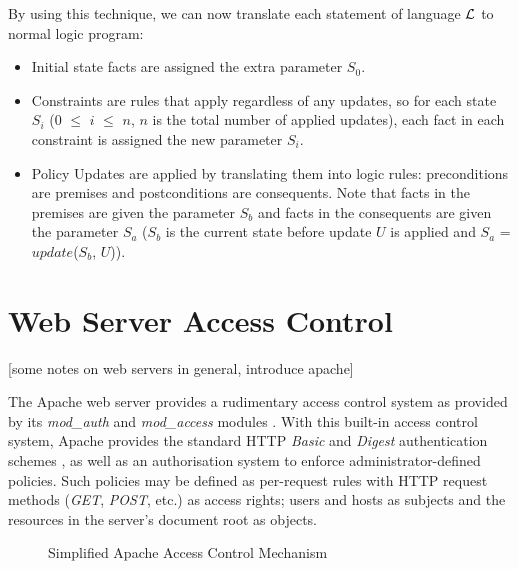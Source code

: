 \documentclass[11pt]{llncs}
\begin{document}
      By using this technique, we can now translate each statement of language
      ${\cal L}$ to normal logic program:

      \begin{itemize}
        \item
          Initial state facts are assigned the extra parameter $S_{0}$.
        \vspace{1mm}
        \item
          Constraints are rules that apply regardless of any updates, so
          for each state $S_{i}$ ($0$ $\leq$ $i$ $\leq$ $n$, $n$ is the total
          number of applied updates), each fact in each constraint is assigned
          the new parameter $S_{i}$.
        \vspace{1mm}
        \item
          Policy Updates are applied by translating them into logic rules:
          preconditions are premises and postconditions are consequents. Note
          that facts in the premises are given the parameter $S_{b}$ and
          facts in the consequents are given the parameter $S_{a}$ ($S_{b}$ is
          the current state before update $U$ is applied and $S_{a}$ =
          $update$($S_{b}$, $U$)).
      \end{itemize}

  \section{Web Server Access Control}

    [some notes on web servers in general, introduce apache]

    The Apache web server provides a rudimentary access control system as
    provided by its {\em mod\_auth} and {\em mod\_access} modules
    \cite{AP,LAU}. With this built-in access control system, Apache provides
    the standard HTTP {\em Basic} and {\em Digest} authentication schemes
    \cite{HTTP2}, as well as an authorisation system to enforce
    administrator-defined policies. Such policies may be defined as per-request
    rules with HTTP request methods ({\em GET}, {\em POST}, etc.) \cite{HTTP1}
    as access rights; users and hosts as subjects and the resources in the
    server's document root as objects.

    \begin{figure}[ht]
      \begin{center}
        \caption{Simplified Apache Access Control Mechanism}
        \label{fig-1}
      \end{center}
    \end{figure}
\end{document}
